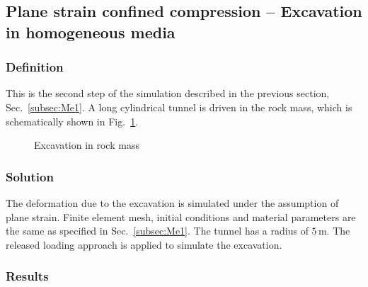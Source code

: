 \subsection{Plane strain confined compression -- Excavation in homogeneous media}
\label{subsec:Me2}

\subsubsection{Definition}
\label{subsubsec:Me2_def}

This is the second step of the simulation described in the previous section, Sec.~\ref{subsec:Me1}. A long cylindrical tunnel is driven in the rock mass, which is schematically shown in Fig.~\ref{Me_fme:excav}.
\begin{figure}[!thb]
  \begin{center}
  \end{center}
  \caption{Excavation in rock mass }
  \label{Me_fme:excav}
\end{figure}


\subsubsection{Solution}
\label{subsubsec:Me2_sol}

The deformation due to the excavation is simulated under the assumption of plane strain. Finite element mesh, initial conditions and material parameters are the same as specified in Sec.~\ref{subsec:Me1}. The tunnel has a radius of $5\,\mbox{m}$. The released loading approach is applied to simulate the excavation.

\subsubsection{Results}
\label{subsubsec:Me2_res}

